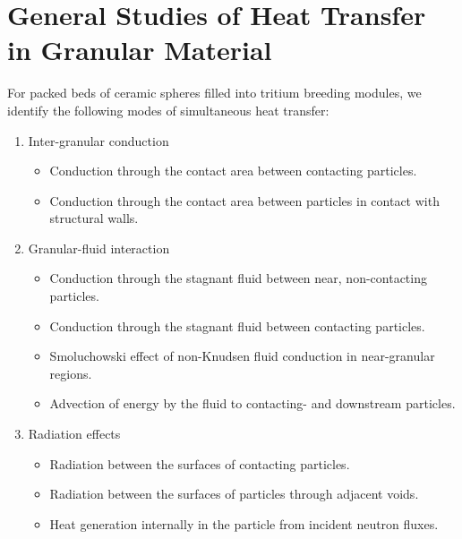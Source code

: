 %
%
\section{General Studies of Heat Transfer in Granular Material}\label{sec:granular-ht-correlations}

For packed beds of ceramic spheres filled into tritium breeding modules, we identify the following modes of simultaneous heat transfer:
\begin{enumerate}
\item Inter-granular conduction
\begin{itemize}
\item Conduction through the contact area between contacting particles.
\item Conduction through the contact area between particles in contact with structural walls.
\end{itemize}
\item Granular-fluid interaction
\begin{itemize}
\item Conduction through the stagnant fluid between near, non-contacting particles.
\item Conduction through the stagnant fluid between contacting particles.
\item Smoluchowski effect of non-Knudsen fluid conduction in near-granular regions.
\item Advection of energy by the fluid to contacting- and downstream particles.
\end{itemize}
\item{Radiation effects}
\begin{itemize}
\item Radiation between the surfaces of contacting particles.
\item Radiation between the surfaces of particles through adjacent voids.
\item Heat generation internally in the particle from incident neutron fluxes.
\end{itemize}
\end{enumerate}

